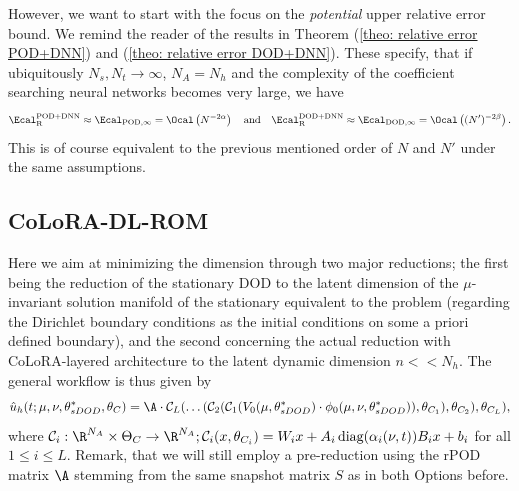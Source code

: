 
However, we want to start with the focus on the \emph{potential} upper relative error bound. We
remind the reader of the results in Theorem (\ref{theo: relative error POD+DNN}) 
and (\ref{theo: relative error DOD+DNN}). These specify, that if ubiquitously 
$N_s, N_t \to \infty$, $N_A = N_h$ and the complexity of the coefficient searching neural networks
becomes very large, we have
\begin{equation*}
    \Ecal_\text{R}^\text{POD+DNN} \approx \Ecal_{\text{POD}, \infty} = 
    \Ocal\left( N^{-2\alpha} \right) 
    \quad \text{and} \quad
    \Ecal_\text{R}^\text{DOD+DNN} \approx \Ecal_{\text{DOD}, \infty} = 
    \Ocal\left( (N')^{-2\beta} \right).
\end{equation*}
This is of course equivalent to the previous mentioned order of $N$ and $N'$ under the same assumptions.


\subsection{CoLoRA-DL-ROM}


Here we aim at minimizing the dimension through two major reductions; 
the first being the reduction of the stationary DOD to the latent dimension 
of the $\mu$-invariant solution manifold of the stationary equivalent to the problem 
(regarding the Dirichlet boundary conditions as the initial conditions on some a priori defined boundary), 
and the second concerning the actual reduction with CoLoRA-layered architecture to the 
latent dynamic dimension $n << N_h$. The general workflow is thus given by 
\begin{equation}
    \hat{u}_h(t; \mu, \nu, \theta^*_{sDOD}, \theta_{C}) = \A \cdot 
    \mathcal{C}_L( \dots (\mathcal{C}_2(\mathcal{C}_1(V_0(\mu, \theta^*_{sDOD}) 
    \cdot \phi_0(\mu, \nu, \theta^*_{sDOD})), \theta_{C_1}), \theta_{C_2}), \theta_{C_L}),
\end{equation}
where $\mathcal{C}_i: \R^{N_A} \times \Theta_C \to \R^{N_A}; 
\mathcal{C}_i(x, \theta_{C_i}) = W_i x + A_i \, \text{diag}(\alpha_i(\nu, t)) B_i x + b_i$ 
for all $1 \leq i \leq L.$
Remark, that we will still employ a pre-reduction using the rPOD matrix $\A$ stemming from the 
same snapshot matrix $S$ as in both Options before.

